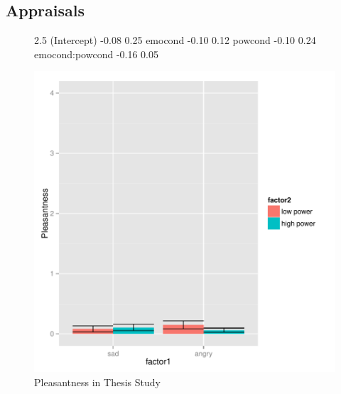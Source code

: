 \documentclass[man,apacite,floatsintext]{apa6}
\begin{document}
\subsection{Appraisals}
\newpage
\begin{figure}
\begin{Schunk}
\begin{Soutput}
                2.5 %
(Intercept)     -0.08   0.25
emocond         -0.10   0.12
powcond         -0.10   0.24
emocond:powcond -0.16   0.05
\end{Soutput}
\end{Schunk}
\includegraphics{PowerResults-ThesisPleas}
\caption{Pleasantness in Thesis Study}
\end{figure}
\newpage
\end{document}
